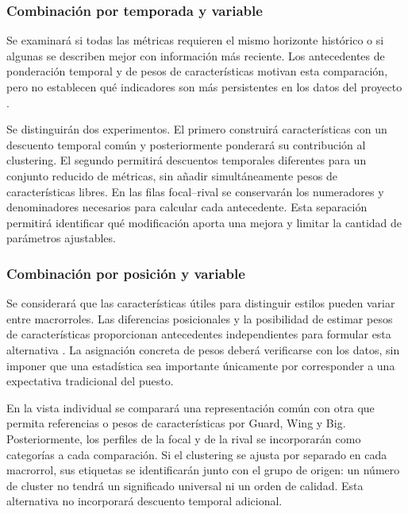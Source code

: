 \subsubsection{Combinación por temporada y variable}
\label{subsubsec:ponderacion-temporada-variable}
Se examinará si todas las métricas requieren el mismo horizonte histórico o si algunas se describen mejor con información más reciente. Los antecedentes de ponderación temporal y de pesos de características motivan esta comparación, pero no establecen qué indicadores son más persistentes en los datos del proyecto \cite{dixon1997scores,huang2005variableweighting}.

Se distinguirán dos experimentos. El primero construirá características con un descuento temporal común y posteriormente ponderará su contribución al clustering. El segundo permitirá descuentos temporales diferentes para un conjunto reducido de métricas, sin añadir simultáneamente pesos de características libres. En las filas focal--rival se conservarán los numeradores y denominadores necesarios para calcular cada antecedente. Esta separación permitirá identificar qué modificación aporta una mejora y limitar la cantidad de parámetros ajustables.

\subsubsection{Combinación por posición y variable}
\label{subsubsec:ponderacion-posicion-variable}
Se considerará que las características útiles para distinguir estilos pueden variar entre macrorroles. Las diferencias posicionales y la posibilidad de estimar pesos de características proporcionan antecedentes independientes para formular esta alternativa \cite{gomez2007posicioneswnba,huang2005variableweighting}. La asignación concreta de pesos deberá verificarse con los datos, sin imponer que una estadística sea importante únicamente por corresponder a una expectativa tradicional del puesto.

En la vista individual se comparará una representación común con otra que permita referencias o pesos de características por Guard, Wing y Big. Posteriormente, los perfiles de la focal y de la rival se incorporarán como categorías a cada comparación. Si el clustering se ajusta por separado en cada macrorrol, sus etiquetas se identificarán junto con el grupo de origen: un número de cluster no tendrá un significado universal ni un orden de calidad. Esta alternativa no incorporará descuento temporal adicional.

